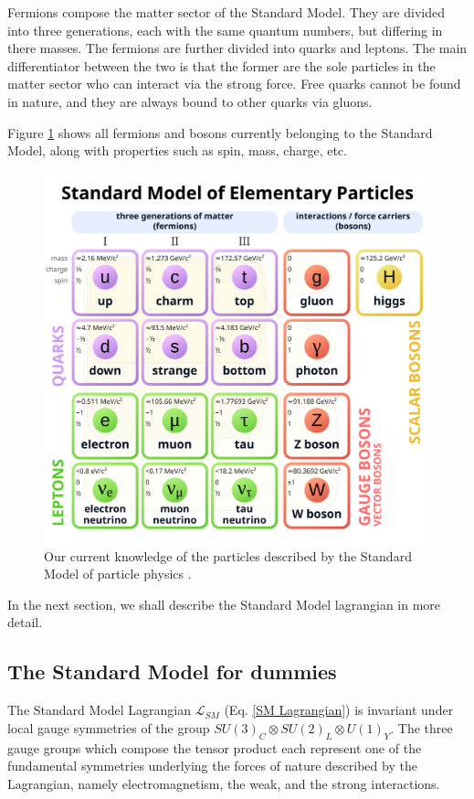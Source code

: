 \documentclass[10pt,a4paper]{book}
\begin{document}
Fermions compose the matter sector of the Standard Model. They are divided into three generations, each with the same quantum numbers, but differing in there masses. The fermions are further divided into quarks and leptons. The main differentiator between the two is that the former are the sole particles in the matter sector who can interact via the strong force. Free quarks cannot be found in nature, and they are always bound to other quarks via gluons. 

Figure \ref{sm particles} shows all fermions and bosons currently belonging to the Standard Model, along with properties such as spin, mass, charge, etc.

\begin{figure}
    \centering
    \includegraphics[width=0.75\linewidth]{theory chapter/Standard_Model_of_Elementary_Particles.png}
    \caption{Our current knowledge of the particles described by the Standard Model of particle physics \cite{wiki:sm}.}
    \label{sm particles}
\end{figure}

In the next section, we shall describe the Standard Model lagrangian in more detail. 

\subsection{The Standard Model for dummies}

The Standard Model Lagrangian $\mathcal{L}_{SM}$ (Eq. \ref{SM Lagrangian}) is invariant under local gauge symmetries of the group $SU(3)_C\otimes SU(2)_L \otimes U(1)_Y$. The three gauge groups which compose the tensor product each represent one of the fundamental symmetries underlying the forces of nature described by the Lagrangian, namely electromagnetism, the weak, and the strong interactions.
\end{document}
